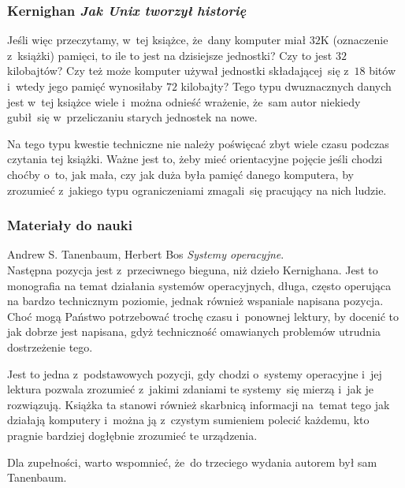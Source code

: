 \documentclass[10pt,t]{beamer}
\begin{document}
\begin{frame}
  \frametitle{Kernighan \textit{Jak Unix tworzył historię}}


  Jeśli więc przeczytamy, w~tej książce, że~dany komputer miał
  $32\text{K}$ (oznaczenie z~książki) pamięci, to ile to jest na dzisiejsze
  jednostki? Czy to jest $32$ kilobajtów? Czy też może komputer używał
  jednostki składającej~się z~$18$ bitów i~wtedy jego pamięć wynosiłaby
  $72$ kilobajty? Tego typu dwuznacznych danych jest w~tej książce wiele
  i~można odnieść wrażenie, że~sam autor niekiedy gubił~się w~przeliczaniu
  starych jednostek na nowe.

  Na tego typu kwestie techniczne nie należy poświęcać zbyt wiele czasu
  podczas czytania tej książki. Ważne jest to, żeby mieć orientacyjne
  pojęcie jeśli chodzi choćby o~to, jak mała, czy jak duża była pamięć
  danego komputera, by zrozumieć z~jakiego typu ograniczeniami zmagali~się
  pracujący na nich ludzie.

\end{frame}





\begin{frame}
  \frametitle{Materiały do nauki}


  Andrew S. Tanenbaum, Herbert Bos \textit{Systemy operacyjne}. \\
  Następna pozycja jest z~przeciwnego bieguna, niż dzieło Kernighana. Jest
  to monografia na temat działania systemów operacyjnych, długa, często
  operująca na bardzo technicznym poziomie, jednak również wspaniale
  napisana pozycja. Choć mogą Państwo potrzebować trochę czasu i~ponownej
  lektury, by docenić to jak dobrze jest napisana, gdyż techniczność
  omawianych problemów utrudnia dostrzeżenie tego.

  Jest to jedna z~podstawowych pozycji, gdy chodzi o~systemy operacyjne
  i~jej lektura pozwala zrozumieć z~jakimi zdaniami te systemy~się mierzą
  i~jak je rozwiązują. Książka ta stanowi również skarbnicą informacji
  na~temat tego jak działają komputery i~można ją z~czystym sumieniem
  polecić każdemu, kto pragnie bardziej dogłębnie zrozumieć te urządzenia.

  Dla zupełności, warto wspomnieć, że~do trzeciego wydania autorem był
  sam Tanenbaum.

\end{frame}
\end{document}
